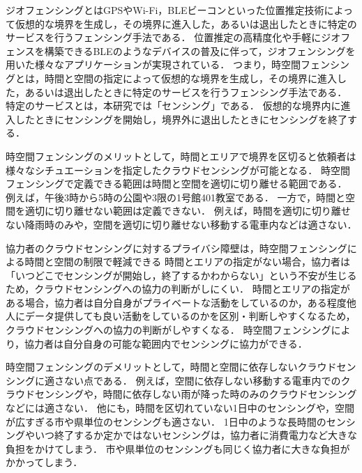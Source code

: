 ジオフェンシングとはGPSやWi-Fi，BLEビーコンといった位置推定技術によって仮想的な境界を生成し，その境界に進入した，あるいは退出したときに特定のサービスを行うフェンシング手法である．
位置推定の高精度化や手軽にジオフェンスを構築できるBLEのようなデバイスの普及に伴って，ジオフェンシングを用いた様々なアプリケーションが実現されている．
つまり，時空間フェンシングとは，時間と空間の指定によって仮想的な境界を生成し，その境界に進入した，あるいは退出したときに特定のサービスを行うフェンシング手法である．
特定のサービスとは，本研究では「センシング」である．
仮想的な境界内に進入したときにセンシングを開始し，境界外に退出したときにセンシングを終了する．

時空間フェンシングのメリットとして，時間とエリアで境界を区切ると依頼者は様々なシチュエーションを指定したクラウドセンシングが可能となる．
時空間フェンシングで定義できる範囲は時間と空間を適切に切り離せる範囲である．
例えば，午後3時から5時の公園や3限の1号館401教室である．
一方で，時間と空間を適切に切り離せない範囲は定義できない．
例えば，時間を適切に切り離せない降雨時のみや，空間を適切に切り離せない移動する電車内などは適さない．

協力者のクラウドセンシングに対するプライバシ障壁は，時空間フェンシングによる時間と空間の制限で軽減できる
時間とエリアの指定がない場合，協力者は「いつどこでセンシングが開始し，終了するかわからない」という不安が生じるため，クラウドセンシングへの協力の判断がしにくい．
時間とエリアの指定がある場合，協力者は自分自身がプライベートな活動をしているのか，ある程度他人にデータ提供しても良い活動をしているのかを区別・判断しやすくなるため，クラウドセンシングへの協力の判断がしやすくなる．
時空間フェンシングにより，協力者は自分自身の可能な範囲内でセンシングに協力ができる．

時空間フェンシングのデメリットとして，時間と空間に依存しないクラウドセンシングに適さない点である．
例えば，空間に依存しない移動する電車内でのクラウドセンシングや，時間に依存しない雨が降った時のみのクラウドセンシングなどには適さない．
他にも，時間を区切れていない1日中のセンシングや，空間が広すぎる市や県単位のセンシングも適さない．
1日中のような長時間のセンシングやいつ終了するか定かではないセンシングは，協力者に消費電力など大きな負担をかけてしまう．
市や県単位のセンシングも同じく協力者に大きな負担がかかってしまう．

